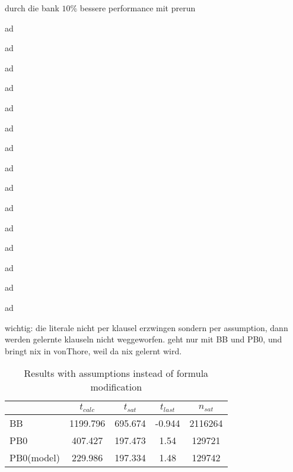 durch die bank $10\%$ bessere performance mit prerun

ad

ad

ad

ad

ad

ad

ad

ad

ad

ad

ad

ad

ad

ad

ad

wichtig: die literale nicht per klausel erzwingen sondern per assumption, dann werden gelernte klauseln nicht weggeworfen. geht nur mit BB und PB0, und bringt nix in vonThore, weil da nix gelernt wird.

\begin{wraptable}{l}{8cm}
\begin{tabular}{l| c c c c}
& $t_{calc}$ & $t_{sat}$ & $t_{last}$ & $n_{sat}$ \\
\hline
BB & 1199.796 & 695.674 & -0.944 & 2116264\\
PB0 & 407.427 & 197.473 & 1.54 & 129721\\
PB0(model) & 229.986 & 197.334 & 1.48 & 129742\\
\end{tabular}
\caption{Results with assumptions instead of formula modification}
\label{tab:pofAssump}
\end{wraptable}